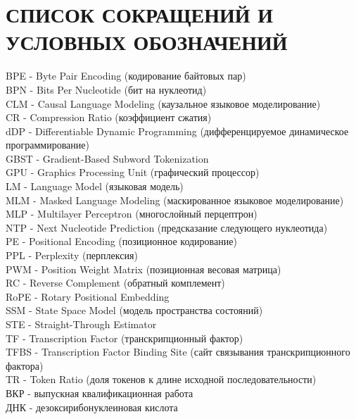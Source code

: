\chapter*{СПИСОК СОКРАЩЕНИЙ И УСЛОВНЫХ ОБОЗНАЧЕНИЙ}
\setlength{\parindent}{0pt}
BPE - Byte Pair Encoding (кодирование байтовых пар)\\[0.5em]
BPN - Bits Per Nucleotide (бит на нуклеотид)\\[0.5em]
CLM - Causal Language Modeling (каузальное языковое моделирование)\\[0.5em]
CR - Compression Ratio (коэффициент сжатия)\\[0.5em]
dDP - Differentiable Dynamic Programming (дифференцируемое
динамическое программирование)\\[0.5em]
GBST - Gradient-Based Subword Tokenization\\[0.5em]
GPU - Graphics Processing Unit (графический процессор)\\[0.5em]
LM - Language Model (языковая модель)\\[0.5em]
MLM - Masked Language Modeling (маскированное языковое моделирование)\\[0.5em]
MLP - Multilayer Perceptron (многослойный перцептрон)\\[0.5em]
NTP - Next Nucleotide Prediction (предсказание следующего нуклеотида)\\[0.5em]
PE - Positional Encoding (позиционное кодирование)\\[0.5em]
PPL - Perplexity (перплексия)\\[0.5em]
PWM - Position Weight Matrix (позиционная весовая матрица)\\[0.5em]
RC - Reverse Complement (обратный комплемент)\\[0.5em]
RoPE - Rotary Positional Embedding\\[0.5em]
SSM - State Space Model (модель пространства состояний)\\[0.5em]
STE - Straight-Through Estimator\\[0.5em]
TF - Transcription Factor (транскрипционный фактор)\\[0.5em]
TFBS - Transcription Factor Binding Site (сайт связывания
транскрипционного фактора)\\[0.5em]
TR - Token Ratio (доля токенов к длине исходной последовательности)\\[0.5em]
ВКР - выпускная квалификационная работа\\[0.5em]
ДНК - дезоксирибонуклеиновая кислота
